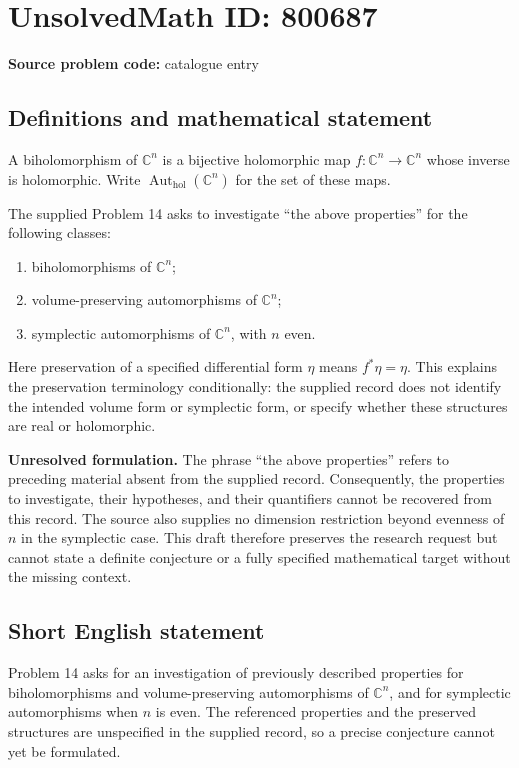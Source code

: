 \documentclass[11pt]{article}
\newcommand{\C}{\mathbb{C}}
\begin{document}
\section*{UnsolvedMath ID: 800687}
\textbf{Source problem code:} catalogue entry
\subsection{Definitions and mathematical statement}
A biholomorphism of \(\C^n\) is a bijective holomorphic map \(f:\C^n\to\C^n\) whose inverse is holomorphic. Write \(\operatorname{Aut}_{\mathrm{hol}}(\C^n)\) for the set of these maps.

The supplied Problem 14 asks to investigate ``the above properties'' for the following classes:
\begin{enumerate}
\item biholomorphisms of \(\C^n\);
\item volume-preserving automorphisms of \(\C^n\);
\item symplectic automorphisms of \(\C^n\), with \(n\) even.
\end{enumerate}
Here preservation of a specified differential form \(\eta\) means \(f^*\eta=\eta\). This explains the preservation terminology conditionally: the supplied record does not identify the intended volume form or symplectic form, or specify whether these structures are real or holomorphic.

\textbf{Unresolved formulation.} The phrase ``the above properties'' refers to preceding material absent from the supplied record. Consequently, the properties to investigate, their hypotheses, and their quantifiers cannot be recovered from this record. The source also supplies no dimension restriction beyond evenness of \(n\) in the symplectic case. This draft therefore preserves the research request but cannot state a definite conjecture or a fully specified mathematical target without the missing context.
\subsection{Short English statement}
Problem 14 asks for an investigation of previously described properties for biholomorphisms and volume-preserving automorphisms of \(\C^n\), and for symplectic automorphisms when \(n\) is even. The referenced properties and the preserved structures are unspecified in the supplied record, so a precise conjecture cannot yet be formulated.
\end{document}
